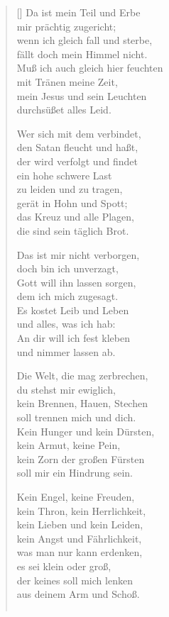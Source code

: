 \begin{multicols}{2}
\begin{verse}[\versewidth]
 Da ist mein Teil und Erbe\\
mir prächtig zugericht;\\
wenn ich gleich fall und sterbe,\\
fällt doch mein Himmel nicht.\\
Muß ich auch gleich hier feuchten\\
mit Tränen meine Zeit,\\
mein Jesus und sein Leuchten\\
durchsüßet alles Leid.

 Wer sich mit dem verbindet,\\
den Satan fleucht und haßt,\\
der wird verfolgt und findet\\
ein hohe schwere Last\\
zu leiden und zu tragen,\\
gerät in Hohn und Spott;\\
das Kreuz und alle Plagen,\\
die sind sein täglich Brot.

 Das ist mir nicht verborgen,\\
doch bin ich unverzagt,\\
Gott will ihn lassen sorgen,\\
dem ich mich zugesagt.\\
Es kostet Leib und Leben\\
und alles, was ich hab:\\
An dir will ich fest kleben\\
und nimmer lassen ab.

 Die Welt, die mag zerbrechen,\\
du stehst mir ewiglich,\\
kein Brennen, Hauen, Stechen\\
soll trennen mich und dich.\\
Kein Hunger und kein Dürsten,\\
kein Armut, keine Pein,\\
kein Zorn der großen Fürsten\\
soll mir ein Hindrung sein.

 Kein Engel, keine Freuden,\\
kein Thron, kein Herrlichkeit,\\
kein Lieben und kein Leiden,\\
kein Angst und Fährlichkeit,\\
was man nur kann erdenken,\\
es sei klein oder groß,\\
der keines soll mich lenken\\
aus deinem Arm und Schoß.

\begin{verbatim}

\end{verbatim}

\end{verse}
\end{multicols}

